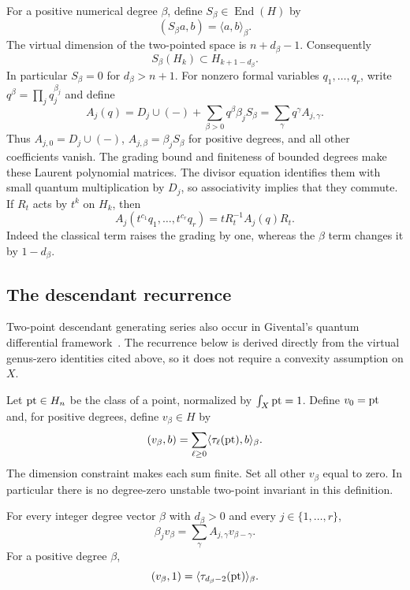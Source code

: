For a positive numerical degree $\beta$, define $S_\beta\in\operatorname{End}(H)$ by
\[
 (S_\beta a,b)=\langle a,b\rangle_\beta.
\]
The virtual dimension of the two-pointed space is $n+d_\beta-1$.
Consequently
\begin{equation}\label{eq:grading}
 S_\beta(H_k)\subset H_{k+1-d_\beta}.
\end{equation}
In particular $S_\beta=0$ for $d_\beta>n+1$. For nonzero formal variables
$q_1,\ldots,q_r$, write $q^\beta=\prod_jq_j^{\beta_j}$ and define
\begin{equation}\label{eq:quantum-operators}
 A_j(q)=D_j\cup(-)+\sum_{\beta>0}q^\beta\beta_jS_\beta
       =\sum_\gamma q^\gamma A_{j,\gamma}.
\end{equation}
Thus $A_{j,0}=D_j\cup(-)$, $A_{j,\beta}=\beta_jS_\beta$ for positive
degrees, and all other coefficients vanish. The grading bound and
finiteness of bounded degrees make these Laurent polynomial matrices.
The divisor equation identifies them with small quantum multiplication
by $D_j$, so associativity implies that they commute. If $R_t$ acts
by $t^k$ on $H_k$, then
\begin{equation}\label{eq:homogeneity}
 A_j(t^{c_1}q_1,\ldots,t^{c_r}q_r)
       =tR_t^{-1}A_j(q)R_t.
\end{equation}
Indeed the classical term raises the grading by one, whereas the
$\beta$ term changes it by $1-d_\beta$.

\subsection{The descendant recurrence}

Two-point descendant generating series also occur in Givental's
quantum differential framework~\cite[\S6]{Givental1996}.  The
recurrence below is derived directly from the virtual genus-zero
identities cited above, so it does not require a convexity assumption
on $X$.

Let $\mathrm{pt}\in H_n$ be the class of a point, normalized by
$\int_X\mathrm{pt}=1$. Define $v_0=\mathrm{pt}$ and, for positive degrees, define
$v_\beta\in H$ by
\[
 (v_\beta,b)=\sum_{\ell\ge0}
             \langle\tau_\ell(\mathrm{pt}),b\rangle_\beta.
\]
The dimension constraint makes each sum finite. Set all other
$v_\beta$ equal to zero. In particular there is no degree-zero
unstable two-point invariant in this definition.

\begin{lemma}\label{lem:recurrence}
For every integer degree vector $\beta$ with $d_\beta>0$ and every
$j\in\{1,\ldots,r\}$,
\begin{equation}\label{eq:recurrence}
 \beta_jv_\beta=\sum_\gamma A_{j,\gamma}v_{\beta-\gamma}.
\end{equation}
For a positive degree $\beta$,
\begin{equation}\label{eq:string-pairing}
 (v_\beta,1)=\langle\tau_{d_\beta-2}(\mathrm{pt})\rangle_\beta.
\end{equation}
\end{lemma}

